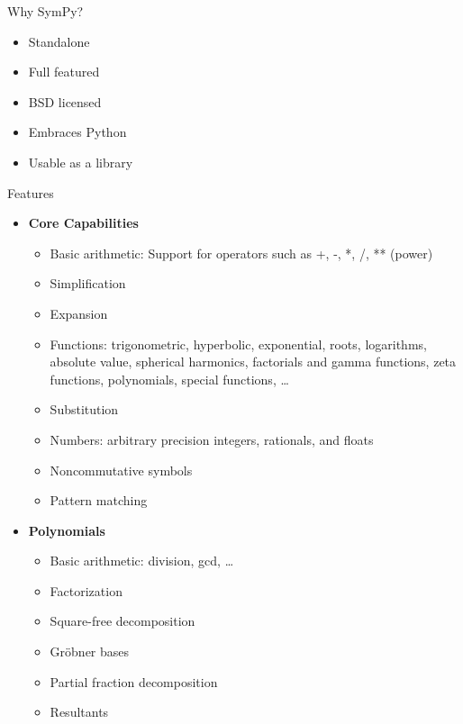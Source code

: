 \documentclass[xcolor=svgnames]{beamer}
\begin{document}
\begin{frame}{Why SymPy?}
  \begin{block}{}
    \begin{itemize}
      \item Standalone
      \item Full featured
      \item BSD licensed
      \item Embraces Python
      \item Usable as a library
    \end{itemize}
  \end{block}
\end{frame}

\begin{frame}{Features}
  \begin{multicols}{2}
    \tiny
    \begin{itemize}
    \item \textbf{Core Capabilities}
      \begin{itemize}
        \tiny
      \item Basic arithmetic: Support for operators such as +, -, *, /, ** (power)
      \item Simplification
      \item Expansion
      \item Functions: trigonometric, hyperbolic, exponential, roots, logarithms,
        absolute value, spherical harmonics, factorials and gamma functions, zeta
        functions, polynomials, special functions, \ldots
      \item Substitution
      \item Numbers: arbitrary precision integers, rationals, and floats
      \item Noncommutative symbols
      \item Pattern matching
      \end{itemize}
    \item \textbf{Polynomials}
      \begin{itemize}
        \tiny
      \item Basic arithmetic: division, gcd, \ldots
      \item Factorization
      \item Square-free decomposition
      \item Gröbner bases
      \item Partial fraction decomposition
      \item Resultants
      \end{itemize}

\end{itemize}
\end{multicols}
\end{frame}
\end{document}
